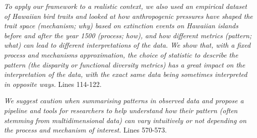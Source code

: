 \documentclass[
]{article}
\begin{document}
\textit{To apply our framework to a realistic context, we also used an empirical dataset of Hawaiian bird traits and looked at how anthropogenic pressures have shaped the trait space (mechanism; why) based on extinction events on Hawaiian islands before and after the year 1500 (process; how), and how different metrics (pattern; what) can lead to different interpretations of the data.
We show that, with a fixed process and mechanisms approximation, the choice of statistic to describe the pattern (the disparity or functional diversity metrics) has a great impact on the interpretation of the data, with the exact same data being sometimes interpreted in opposite ways.}
Lines 114-122.


\textit{We suggest caution when summarising patterns in observed data and propose a pipeline and tools for researchers to help understand how their pattern (often stemming from multidimensional data) can vary intuitively or not depending on the process and mechanism of interest.}
Lines 570-573.

\end{document}
